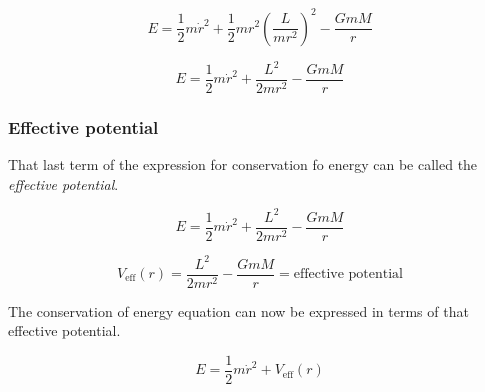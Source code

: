 \documentclass[12pt]{article}
\begin{document}
\[
E = \frac{1}{2}m\dot{r}^2 + \frac{1}{2}mr^2\left( \frac{L}{mr^2} \right)^2 - \frac{GmM}{r}
\]

\[
E = \frac{1}{2}m \dot{r}^2 + \frac{L^2}{2mr^2} - \frac{GmM}{r}
\]

\newpage

\subsubsection{Effective potential}

That last term of the expression for conservation fo energy can be called the \emph{effective potential}.

\[
E = \frac{1}{2}m \dot{r}^2 + \boxed{\frac{L^2}{2mr^2} - \frac{GmM}{r}}
\]

\[
V_{\text{eff}}(r) = \frac{L^2}{2mr^2} - \frac{GmM}{r} = \text{effective potential}
\]

The conservation of energy equation can now be expressed in terms of that effective potential.

\[
E = \frac{1}{2}m\dot{r}^2 + V_{\text{eff}}(r)
\]
\end{document}
